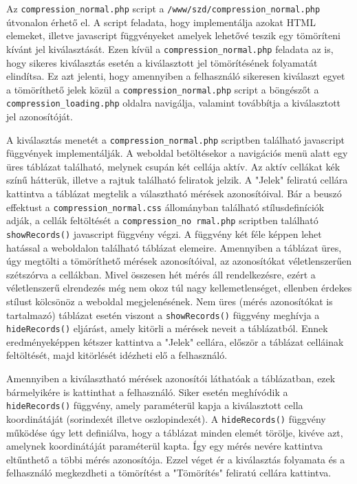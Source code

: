 \documentclass[oneside,titlepage,12pt,a4paper]{report}
\begin{document}
Az \texttt{compression\_normal.php} script a \texttt{/www/szd/compression\_normal.php} útvonalon érhető el. A script feladata, hogy implementálja azokat HTML elemeket, illetve javascript függvényeket amelyek lehetővé teszik egy tömöríteni kívánt jel kiválasztását. Ezen kívül a  \texttt{compression\_normal.php} feladata az is, hogy sikeres kiválasztás esetén a kiválasztott jel tömörítésének folyamatát elindítsa. Ez azt jelenti, hogy amennyiben a felhasználó sikeresen kiválaszt egyet a tömöríthető jelek közül a \texttt{compression\_normal.php} script a böngészőt a \texttt{compression\_loading.php} oldalra navigálja, valamint továbbítja a kiválasztott jel azonosítóját. 
\par A kiválasztás menetét a \texttt{compression\_normal.php} scriptben található javascript függvények implementálják. A weboldal betöltésekor a navigációs menü alatt egy üres táblázat található, melynek csupán két cellája aktív. Az aktív cellákat kék színű hátterük, illetve a rajtuk található feliratok jelzik. A "Jelek" feliratú cellára kattintva a táblázat megtelik a választható mérések azonosítóival. Bár a beuszó effektust a \texttt{compression\_normal.css} állományban található stílusdefiníciók adják, a cellák feltöltését a \texttt{compression\_no
rmal.php} scriptben található \texttt{showRecords()} javascript függvény végzi. A függvény két féle képpen lehet hatással a weboldalon található táblázat elemeire. Amennyiben a táblázat üres, úgy megtölti a tömöríthető mérések azonosítóival, az azonosítókat véletlenszerűen szétszórva a cellákban. Mivel összesen hét mérés áll rendelkezésre, ezért a véletlenszerű elrendezés még nem okoz túl nagy kellemetlenséget, ellenben érdekes stílust kölcsönöz a weboldal megjelenésének. Nem üres (mérés azonosítókat is tartalmazó) táblázat esetén viszont a \texttt{showRecords()} függvény meghívja a \texttt{hideRecords()} eljárást, amely kitörli a mérések neveit a táblázatból. Ennek eredményeképpen kétszer kattintva a "Jelek" cellára, először a táblázat celláinak feltöltését, majd kitörlését idézheti elő a felhasználó. 
\par Amennyiben a kiválasztható mérések azonosítói láthatóak a táblázatban, ezek bármelyikére is kattinthat a felhasználó. Siker esetén meghívódik a \texttt{hideRecords()} függvény, amely paraméterül kapja a kiválasztott cella koordinátáját (sorindexét illetve oszlopindexét). A \texttt{hideRecords()} függvény működése úgy lett definiálva, hogy a táblázat minden elemét törölje, kivéve azt, amelynek koordinátáját paraméterül kapta. Így egy mérés nevére kattintva eltűnthető a többi mérés azonosítója. Ezzel véget ér a kiválasztás folyamata és a felhasználó megkezdheti a tömörítést a "Tömörítés" feliratú cellára kattintva. 
\end{document}
